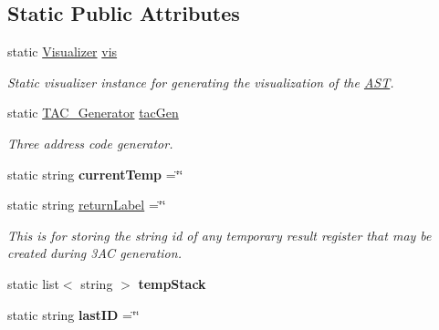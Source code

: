 \subsection*{Static Public Attributes}
\begin{DoxyCompactItemize}
\item 
\hypertarget{classAST_a5fdfd5f7b104dd92889163bdadbc68d6}{static \hyperlink{classVisualizer}{Visualizer} \hyperlink{classAST_a5fdfd5f7b104dd92889163bdadbc68d6}{vis}}\label{classAST_a5fdfd5f7b104dd92889163bdadbc68d6}

\begin{DoxyCompactList}\small\item\em Static visualizer instance for generating the visualization of the \hyperlink{classAST}{A\-S\-T}. \end{DoxyCompactList}\item 
\hypertarget{classAST_a8a3ace322f50e030331065d644ee55ee}{static \hyperlink{classTAC__Generator}{T\-A\-C\-\_\-\-Generator} \hyperlink{classAST_a8a3ace322f50e030331065d644ee55ee}{tac\-Gen}}\label{classAST_a8a3ace322f50e030331065d644ee55ee}

\begin{DoxyCompactList}\small\item\em Three address code generator. \end{DoxyCompactList}\item 
\hypertarget{classAST_a1f69448c6dc368d005631a128460083d}{static string {\bfseries current\-Temp} =\char`\"{}\char`\"{}}\label{classAST_a1f69448c6dc368d005631a128460083d}

\item 
\hypertarget{classAST_a551aec090c932ab69365238b40a8a4eb}{static string \hyperlink{classAST_a551aec090c932ab69365238b40a8a4eb}{return\-Label} =\char`\"{}\char`\"{}}\label{classAST_a551aec090c932ab69365238b40a8a4eb}

\begin{DoxyCompactList}\small\item\em This is for storing the string id of any temporary result register that may be created during 3\-A\-C generation. \end{DoxyCompactList}\item 
\hypertarget{classAST_a73c0a266df52be71e6b527b6aa635173}{static list$<$ string $>$ {\bfseries temp\-Stack}}\label{classAST_a73c0a266df52be71e6b527b6aa635173}

\item 
\hypertarget{classAST_abf9e84b541ff04b7bb64e6e4371512d4}{static string {\bfseries last\-I\-D} =\char`\"{}\char`\"{}}\label{classAST_abf9e84b541ff04b7bb64e6e4371512d4}


\end{DoxyCompactItemize}
